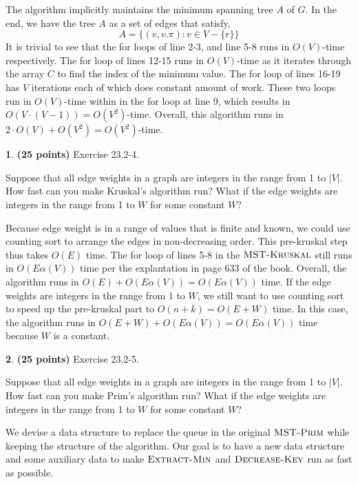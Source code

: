 \documentclass[11pt]{article}
\theoremstyle{definition}
\theoremstyle{theorem}
\newtheorem{prob}{}
\newcommand{\solution}{\medskip\noindent{\color{DarkBlue}\textbf{Solution:}}}
\begin{document}
The algorithm implicitly maintains the minimum spanning tree $A$ of $G$. In the end, we have the tree $A$ as a set of edges that satisfy,
\[
A = \{(v, v.\pi): v \in V - \{r\} \}
\]
It is trivial to see that the for loops of line 2-3, and line 5-8 runs in $O(V)$-time respectively. The for loop of lines 12-15 runs in $O(V)$-time as it iterates through the array $C$ to find the index of the minimum value. The for loop of lines 16-19 has $V$ iterations each of which does constant amount of work. These two loops run in $O(V)$-time within in the for loop at line 9, which results in $O(V \cdot (V-1)) = O(V^2)$-time. Overall, this algorithm runs in $2 \cdot O(V) + O(V^2) = O(V^2)$-time.

\newpage
\begin{prob} \textbf{(25 points)} Exercise 23.2-4.
\end{prob}

Suppose that all edge weights in a graph are integers in the range from 1 to $|V|$. How fast can you make Kruskal’s algorithm run? What if the edge weights are integers in the range from 1 to $W$ for some constant $W$?

\solution

Because edge weight is in a range of values that is finite and known, we could use counting sort to arrange the edges in non-decreasing order. This pre-kruskal step thus takes $O(E)$ time. The for loop of lines 5-8 in the $\textproc{\textsc{MST-Kruskal}}$ still runs in $O(E \alpha{(V)})$ time per the explantation in page 633 of the book. Overall, the algorithm runs in $O(E) + O(E \alpha{(V)}) = O(E \alpha{(V)})$ time. If the edge weights are integers in the range from 1 to $W$, we still want to use counting sort to speed up the pre-kruskal part to $O(n + k) = O(E + W)$ time. In this case, the algorithm runs in $O(E + W) + O(E \alpha{(V)}) = O(E \alpha{(V)})$ time because $W$ is a constant.


\newpage
\begin{prob} \textbf{(25 points)} Exercise 23.2-5.
\end{prob}

Suppose that all edge weights in a graph are integers in the range from 1 to $|V|$. How fast can you make Prim’s algorithm run? What if the edge weights are integers in the range from 1 to $W$ for some constant $W$?

\solution

We devise a data structure to replace the queue in the original $\textproc{\textsc{MST-Prim}}$ while keeping the structure of the algorithm. Our goal is to have a new data structure and some auxiliary data to make $\textproc{\textsc{Extract-Min}}$ and $\textproc{\textsc{Decrease-Key}}$ run as fast as possible. 
\end{document}
